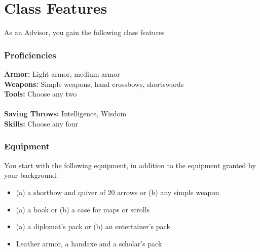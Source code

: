 \documentclass[letterpaper,openany,twoside,twocolumn]{book}
\begin{document}
	\section*{Class Features}
	As an Advisor, you gain the following class features
	
	
	\subsubsection*{Proficiencies}
	\textbf{Armor:} Light armor, medium armor\\
	\textbf{Weapons:} Simple weapons, hand crossbows, shortswords\\
	\textbf{Tools:} Choose any two\\\\
	\textbf{Saving Throws:} Intelligence, Wisdom\\
	\textbf{Skills:} Choose any four
	
	\subsubsection*{Equipment}
	You start with the following equipment, in addition to the equipment granted by your background:
	\begin{itemize}
		\item (a) a shortbow and quiver of 20 arrows or (b) any simple weapon
		\item (a) a book or (b) a case for maps or scrolls
		\item (a) a diplomat’s pack or (b) an entertainer's pack
		\item Leather armor, a handaxe and a scholar's pack
	\end{itemize}
	
\end{document}
